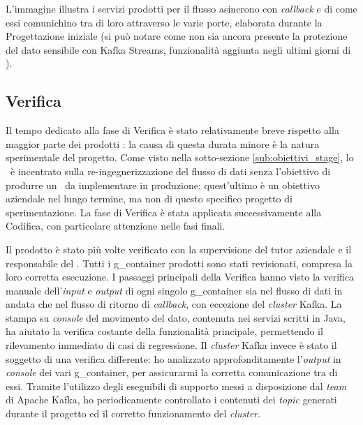 L'immagine illustra i servizi prodotti per il flusso asincrono con \textit{callback} e di come essi comunichino tra di loro attraverso le varie porte, elaborata durante la Progettazione iniziale (si può notare come non sia ancora presente la protezione del dato sensibile con Kafka Streams, funzionalità aggiunta negli ultimi giorni di \stage).


\subsection{Verifica}


Il tempo dedicato alla fase di Verifica è stato relativamente breve rispetto alla maggior parte dei prodotti \software: la causa di questa durata minore è la natura sperimentale del progetto.
Come visto nella sotto-sezione \ref{sub:obiettivi_stage}, lo \stage\ è incentrato sulla re-ingegnerizzazione del flusso di dati senza l'obiettivo di produrre un \middleware\ da implementare in produzione; quest'ultimo è un obiettivo aziendale nel lungo termine, ma non di questo specifico progetto di sperimentazione.
La fase di Verifica è stata applicata successivamente alla Codifica, con particolare attenzione nelle fasi finali.

Il prodotto è stato più volte verificato con la supervisione del tutor aziendale e il responsabile del .
Tutti i \gls{g_container} prodotti sono stati revisionati, compresa la loro corretta esecuzione.
I passaggi principali della Verifica hanno visto la verifica manuale dell'\textit{input} e \textit{output} di ogni singolo \gls{g_container} sia nel flusso di dati in andata che nel flusso di ritorno di \textit{callback}, con eccezione del \textit{cluster} Kafka.
La stampa su \textit{console} del movimento del dato, contenuta nei servizi scritti in Java, ha aiutato la verifica costante della funzionalità principale, permettendo il rilevamento immediato di casi di regressione.
Il \textit{cluster} Kafka invece è stato il soggetto di una verifica differente: ho analizzato approfonditamente l'\textit{output} in \textit{console} dei vari \gls{g_container}, per assicurarmi la corretta comunicazione tra di essi.
Tramite l'utilizzo degli eseguibili di supporto messi a disposizione dal \textit{team} di Apache Kafka, ho periodicamente controllato i contenuti dei \textit{topic} generati durante il progetto ed il corretto funzionamento del \textit{cluster}.


